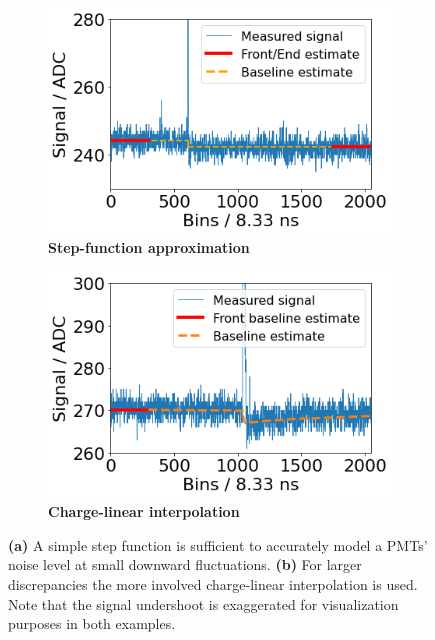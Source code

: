 \begin{figure}
	\begin{subfigure}[b]{0.5\textwidth}
		\centering
		\includegraphics[width=\textwidth]{./plots/baseline_step_function.png}
		\caption{\textbf{Step-function approximation}}
		\label{fig:baseline-step-function-approximation}
	\end{subfigure}
	\hfill
	\begin{subfigure}[b]{0.5\textwidth}
		\centering
		\includegraphics[width=\textwidth]{./plots/baseline_charge_interpolation.png}
		\caption{\textbf{Charge-linear interpolation}}
		\label{fig:baseline-charge-linear-interpolation}
	\end{subfigure}
	\caption{\textbf{(a)} A simple step function is	sufficient to accurately model a PMTs' noise level at small downward fluctuations. \textbf{(b)} For larger 
	discrepancies the more involved charge-linear interpolation is used. Note that the signal undershoot is exaggerated for visualization purposes in both 
	examples.}
\end{figure}

